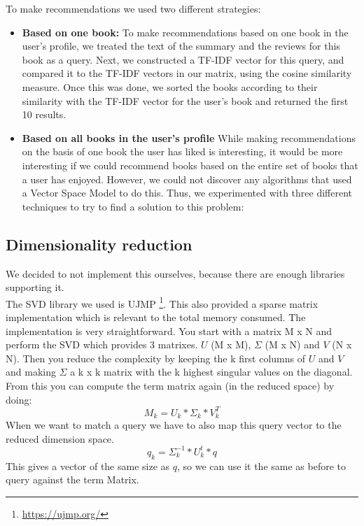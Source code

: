\documentclass[10pt,a4paper]{paper}
\begin{document}
To make recommendations we used two different strategies:
\begin{itemize}
\item \textbf{Based on one book:} To make recommendations based on one book in the user's profile, we treated the text of the summary and the reviews for this book as a query. Next, we constructed a TF-IDF vector for this query, and compared it to the TF-IDF vectors in our matrix, using the cosine similarity measure. Once this was done, we sorted the books according to their similarity with the TF-IDF vector for the user's book and returned the first 10 results.
\item \textbf{Based on all books in the user's profile} While making recommendations on the basis of one book the user has liked is interesting, it would be more interesting if we could recommend books based on the entire set of books that a user has enjoyed. However, we could not discover any algorithms that used a Vector Space Model to do this. Thus, we experimented with three different techniques to try to find a solution to this problem:
\begin{itemize}
\end{itemize}
\end{itemize}

\subsection{Dimensionality reduction}

We decided to not implement this ourselves, because there are enough libraries supporting it.\\
The SVD library we used is UJMP \footnote{\url{https://ujmp.org/}}. This also provided a sparse matrix implementation which is relevant to the total memory consumed. The implementation is very straightforward. You start with a matrix M x N and perform the SVD which provides 3 matrixes. $U$ (M x M), $\Sigma$ (M x N) and $V$ (N x N). Then you reduce the complexity by keeping the k first columns of $U$ and $V$ and making $\Sigma$ a k x k matrix with the k highest singular values on the diagonal. From this you can compute the term matrix again (in the reduced space) by doing:
\[
M_k = U_k * \Sigma_k * V_k^T
\]
When we want to match a query we have to also map this query vector to the reduced dimension space.
\[
q_k = \Sigma_k^{-1} * U_k^t * q
\]
This gives a vector of the same size as $q$, so we can use it the same as before to query against the term Matrix.
\end{document}
